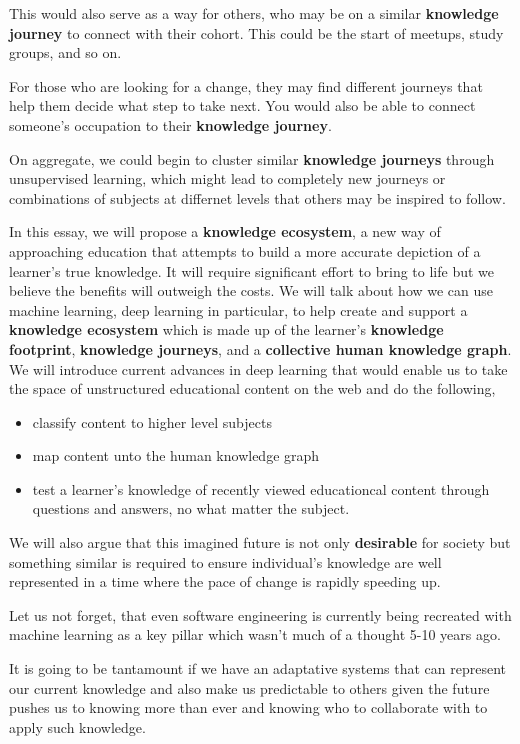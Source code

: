 \documentclass[]{book}
\theoremstyle{definition}
\theoremstyle{definition}
\theoremstyle{definition}
\theoremstyle{remark}
\begin{document}
This would also serve as a way for others, who may be on a similar
\textbf{knowledge journey} to connect with their cohort. This could be
the start of meetups, study groups, and so on.

For those who are looking for a change, they may find different journeys
that help them decide what step to take next. You would also be able to
connect someone's occupation to their \textbf{knowledge journey}.

On aggregate, we could begin to cluster similar \textbf{knowledge
journeys} through unsupervised learning, which might lead to completely
new journeys or combinations of subjects at differnet levels that others
may be inspired to follow.

In this essay, we will propose a \textbf{knowledge ecosystem}, a new way
of approaching education that attempts to build a more accurate
depiction of a learner's true knowledge. It will require significant
effort to bring to life but we believe the benefits will outweigh the
costs. We will talk about how we can use machine learning, deep learning
in particular, to help create and support a \textbf{knowledge ecosystem}
which is made up of the learner's \textbf{knowledge footprint},
\textbf{knowledge journeys}, and a \textbf{collective human knowledge
graph}. We will introduce current advances in deep learning that would
enable us to take the space of unstructured educational content on the
web and do the following,

\begin{itemize}
\item
  classify content to higher level subjects
\item
  map content unto the human knowledge graph
\item
  test a learner's knowledge of recently viewed educationcal content
  through questions and answers, no what matter the subject.
\end{itemize}

We will also argue that this imagined future is not only
\textbf{desirable} for society but something similar is required to
ensure individual's knowledge are well represented in a time where the
pace of change is rapidly speeding up.

Let us not forget, that even software engineering is currently being
recreated with machine learning as a key pillar which wasn't much of a
thought 5-10 years ago.

It is going to be tantamount if we have an adaptative systems that can
represent our current knowledge and also make us predictable to others
given the future pushes us to knowing more than ever and knowing who to
collaborate with to apply such knowledge.
\end{document}
